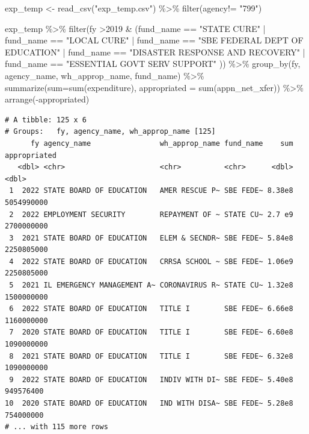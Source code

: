 \documentclass[
  letterpaper,
  DIV=11,
  numbers=noendperiod]{scrreport}
\newenvironment{Shaded}{\begin{snugshade}}{\end{snugshade}}
\newcommand{\AttributeTok}[1]{\textcolor[rgb]{0.40,0.45,0.13}{#1}}
\newcommand{\DecValTok}[1]{\textcolor[rgb]{0.68,0.00,0.00}{#1}}
\newcommand{\FunctionTok}[1]{\textcolor[rgb]{0.28,0.35,0.67}{#1}}
\newcommand{\NormalTok}[1]{\textcolor[rgb]{0.00,0.23,0.31}{#1}}
\newcommand{\OtherTok}[1]{\textcolor[rgb]{0.00,0.23,0.31}{#1}}
\newcommand{\SpecialCharTok}[1]{\textcolor[rgb]{0.37,0.37,0.37}{#1}}
\newcommand{\StringTok}[1]{\textcolor[rgb]{0.13,0.47,0.30}{#1}}
\begin{document}
\begin{Shaded}
\begin{Highlighting}[]
\NormalTok{exp\_temp }\OtherTok{\textless{}{-}} \FunctionTok{read\_csv}\NormalTok{(}\StringTok{"exp\_temp.csv"}\NormalTok{) }\SpecialCharTok{\%\textgreater{}\%} 
  \FunctionTok{filter}\NormalTok{(agency}\SpecialCharTok{!=} \StringTok{"799"}\NormalTok{)}

\NormalTok{exp\_temp }\SpecialCharTok{\%\textgreater{}\%} 
  \FunctionTok{filter}\NormalTok{(fy }\SpecialCharTok{\textgreater{}}\DecValTok{2019} \SpecialCharTok{\&}\NormalTok{ (fund\_name }\SpecialCharTok{==} \StringTok{"STATE CURE"} \SpecialCharTok{|}\NormalTok{ fund\_name }\SpecialCharTok{==} \StringTok{"LOCAL CURE"} \SpecialCharTok{|}\NormalTok{ fund\_name }\SpecialCharTok{==} \StringTok{"SBE FEDERAL DEPT OF EDUCATION"} \SpecialCharTok{|}\NormalTok{ fund\_name }\SpecialCharTok{==} \StringTok{"DISASTER RESPONSE AND RECOVERY"} \SpecialCharTok{|}\NormalTok{ fund\_name }\SpecialCharTok{==} \StringTok{"ESSENTIAL GOVT SERV SUPPORT"}\NormalTok{ )) }\SpecialCharTok{\%\textgreater{}\%} 
  \FunctionTok{group\_by}\NormalTok{(fy, agency\_name, wh\_approp\_name, fund\_name) }\SpecialCharTok{\%\textgreater{}\%} 
  \FunctionTok{summarize}\NormalTok{(}\AttributeTok{sum=}\FunctionTok{sum}\NormalTok{(expenditure),}
            \AttributeTok{appropriated =} \FunctionTok{sum}\NormalTok{(appn\_net\_xfer)) }\SpecialCharTok{\%\textgreater{}\%} 
  \FunctionTok{arrange}\NormalTok{(}\SpecialCharTok{{-}}\NormalTok{appropriated)}
\end{Highlighting}
\end{Shaded}

\begin{verbatim}
# A tibble: 125 x 6
# Groups:   fy, agency_name, wh_approp_name [125]
      fy agency_name                wh_approp_name fund_name    sum appropriated
   <dbl> <chr>                      <chr>          <chr>      <dbl>        <dbl>
 1  2022 STATE BOARD OF EDUCATION   AMER RESCUE P~ SBE FEDE~ 8.38e8   5054990000
 2  2022 EMPLOYMENT SECURITY        REPAYMENT OF ~ STATE CU~ 2.7 e9   2700000000
 3  2021 STATE BOARD OF EDUCATION   ELEM & SECNDR~ SBE FEDE~ 5.84e8   2250805000
 4  2022 STATE BOARD OF EDUCATION   CRRSA SCHOOL ~ SBE FEDE~ 1.06e9   2250805000
 5  2021 IL EMERGENCY MANAGEMENT A~ CORONAVIRUS R~ STATE CU~ 1.32e8   1500000000
 6  2022 STATE BOARD OF EDUCATION   TITLE I        SBE FEDE~ 6.66e8   1160000000
 7  2020 STATE BOARD OF EDUCATION   TITLE I        SBE FEDE~ 6.60e8   1090000000
 8  2021 STATE BOARD OF EDUCATION   TITLE I        SBE FEDE~ 6.32e8   1090000000
 9  2022 STATE BOARD OF EDUCATION   INDIV WITH DI~ SBE FEDE~ 5.40e8    949576400
10  2020 STATE BOARD OF EDUCATION   IND WITH DISA~ SBE FEDE~ 5.28e8    754000000
# ... with 115 more rows
\end{verbatim}
\end{document}
